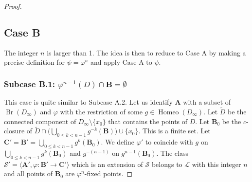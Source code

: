 \documentclass[JEP,XML,SOM,Unicode,NoFloatCountersInSection]{cedram}
\let\mathcal\mathscr
\theoremstyle{plain}
\theoremstyle{definition}
\newcommand{\bA}{{\boldsymbol{A}}}
\newcommand{\bB}{{\boldsymbol{B}}}
\newcommand{\bC}{{\boldsymbol{C}}}
\newcommand{\cL}{\mathcal{L}}
\newcommand{\cS}{\mathcal{S}}
\DeclareMathOperator{\Homeo}{Homeo}
\DeclareMathOperator{\Br}{Br}
\begin{document}
\begin{proof}
\subsection*{Case B} The integer $n$ is larger than 1. The idea is then to reduce to Case A by making a precise definition for $\psi=\varphi^n$ and apply Case A to $\psi$.

\subsubsection*{Subcase \textup{B.1:} $\varphi^{n-1}(D)\cap \bB=\emptyset$} This case is quite similar to Subcase A.2.
Let us identify $\bA$ with a subset of $\Br(D_\infty)$ and $\varphi$ with the restriction of some $g\in\Homeo(D_\infty)$. Let $\widetilde{D}$ be the connected component of $D_\infty\setminus\{x_0\}$ that contains the points of $D$. Let $\bB_0$ be the $c$-closure of $\widetilde{D}\cap\bigl(\bigcup_{0\leq k< n-1}g^{-k}(\bB)\bigr)\cup\{x_0\}$. This is a finite set. Let $\bC'=\bB'=\bigcup_{0\leq k< n-1}g^k(\bB_0)$. We define $\varphi'$ to coincide with $g$ on $\bigcup_{0\leq k< n-1} g^k(\bB_0)$ and $g^{-(n-1)}$ on $g^{n-1}(\bB_0)$. The class $\cS'=\langle \bA',\varphi\colon\bB'\to\bC'\rangle$ which is an extension of $\cS$ belongs to $\cL$ with this integer $n$ and all points of $\bB_0$ are $\varphi^n$-fixed points.


\end{proof}
\end{document}
